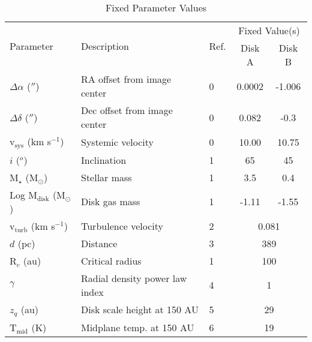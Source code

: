 \begin{table}
  \begin{threeparttable}
    \centering
    \caption{Fixed Parameter Values}
    \label{table:fixed_params}
    \renewcommand{\arraystretch}{1.2}
    \begin{tabular}{l  l  l  c  c }
      \toprule \toprule
      \multirow{2}{*}{Parameter} & \multirow{2}{*}{Description} & \multirow{2}{*}{Ref.} & \multicolumn{2}{c}{Fixed Value(s)} \\
                                 &                              &                         & Disk A & Disk B \\
      \midrule %
      $\Delta \alpha$ ($''$)       &  RA offset from image center     & 0  & 0.0002 & -1.006  \\
      $\Delta \delta$ ($''$)       &  Dec offset from image center    & 0  & 0.082  & -0.3    \\
      v$_\text{sys}$ (km s$^{-1}$) &  Systemic velocity               & 0  & 10.00  & 10.75   \\
      $i$ ($^o$)                   &  Inclination                     & 1  & 65     & 45      \\
      M$_\star$ (M$_\odot$)        &  Stellar mass                    & 1  & 3.5    & 0.4     \\
      Log M$_\text{disk}$ (M$_\odot$) & Disk gas mass\tnote{*}        & 1  & -1.11  & -1.55   \\
      v$_\text{turb}$ (km s$^{-1}$) &  Turbulence velocity            & 2  & \multicolumn{2}{c}{0.081}   \\
      $d$ (pc)                     &  Distance                        & 3  & \multicolumn{2}{c}{389}   \\
      R$_c$ (au)                   &  Critical radius                 & 1  & \multicolumn{2}{c}{100}\\
      $\gamma$                     &  Radial density power law index  & 4  & \multicolumn{2}{c}{1}\\
      $z_q$ (au)                   &  Disk scale height at 150 AU     & 5  & \multicolumn{2}{c}{29}\\
      T$_\text{mid}$ (K)           &  Midplane temp. at 150 AU        & 6  & \multicolumn{2}{c}{19}\\
      \bottomrule
    \end{tabular}


\end{threeparttable}
\end{table}
